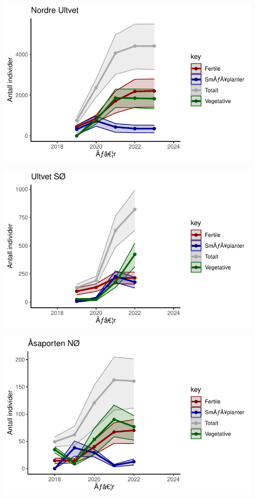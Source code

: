 \documentclass[
  letterpaper,
  DIV=11,
  numbers=noendperiod]{scrreport}
\begin{document}
\includegraphics{localEst_files/figure-pdf/unnamed-chunk-5-5.pdf}

\includegraphics{localEst_files/figure-pdf/unnamed-chunk-5-6.pdf}

\includegraphics{localEst_files/figure-pdf/unnamed-chunk-5-7.pdf}
\end{document}
